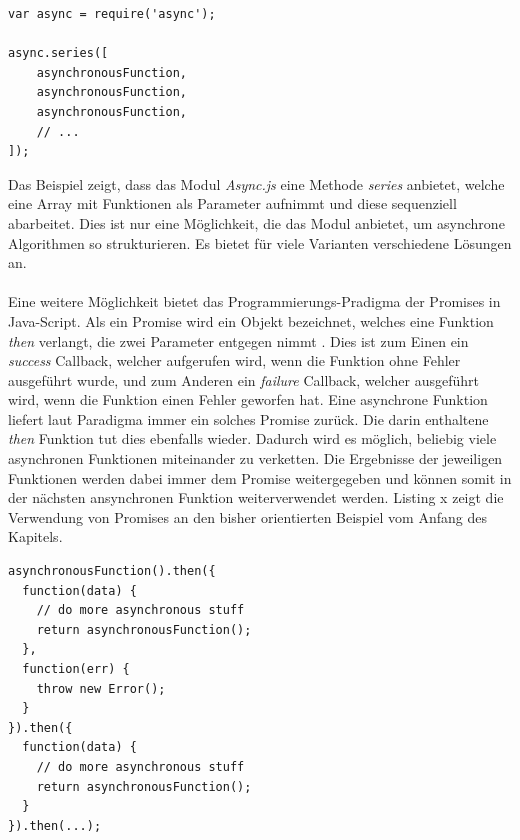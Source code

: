 \vspace{0.6cm}
\begin{lstlisting}[caption=Sequenzielle Abarbeitung von asynchronen Code durch das Async.js Module,label=asyncjs]
var async = require('async');

async.series([
    asynchronousFunction,
    asynchronousFunction,
    asynchronousFunction,
    // ...
]);
\end{lstlisting}
\vspace{0.3cm}

Das Beispiel zeigt, dass das Modul \textit{Async.js} eine Methode \textit{series} anbietet, welche eine Array mit Funktionen als Parameter aufnimmt und diese sequenziell abarbeitet. Dies ist nur eine Möglichkeit, die das Modul anbietet, um asynchrone Algorithmen so strukturieren. Es bietet für viele Varianten verschiedene Lösungen an.\\
\\
Eine weitere Möglichkeit bietet das Programmierungs-Pradigma der \glqq Promises\grqq{} in Java-Script. Als ein Promise wird ein Objekt bezeichnet, welches eine Funktion \textit{then} verlangt, die zwei Parameter entgegen nimmt \cite{promises}. Dies ist zum Einen ein \textit{success} Callback, welcher aufgerufen wird, wenn die Funktion ohne Fehler ausgeführt wurde, und zum Anderen ein \textit{failure} Callback, welcher ausgeführt wird, wenn die Funktion einen Fehler geworfen hat. Eine asynchrone Funktion liefert laut Paradigma immer ein solches Promise zurück. Die darin enthaltene \textit{then} Funktion tut dies ebenfalls wieder. Dadurch wird es möglich, beliebig viele asynchronen Funktionen miteinander zu verketten. Die Ergebnisse der jeweiligen Funktionen werden dabei immer dem Promise weitergegeben und können somit in der nächsten ansynchronen Funktion weiterverwendet werden. Listing x zeigt die Verwendung von Promises an den bisher orientierten Beispiel vom Anfang des Kapitels. 

\vspace{1.8cm}
\begin{lstlisting}[caption=Sequenzielle Abarbeitung von asynchronen Code durch das Async.js Module,label=asyncjs]
asynchronousFunction().then({
  function(data) {
    // do more asynchronous stuff
    return asynchronousFunction();
  },
  function(err) {
    throw new Error();
  }
}).then({
  function(data) {
    // do more asynchronous stuff
    return asynchronousFunction();
  }
}).then(...);
\end{lstlisting}
\vspace{0.1cm}

